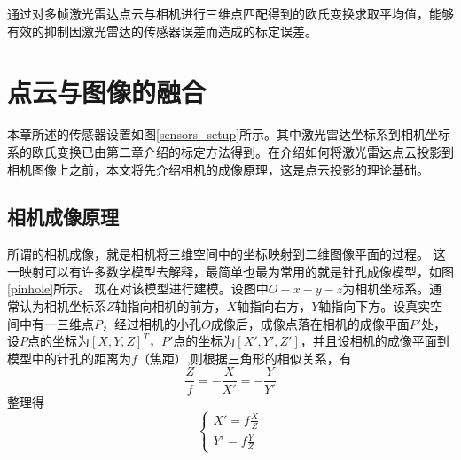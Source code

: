 通过对多帧激光雷达点云与相机进行三维点匹配得到的欧氏变换求取平均值，能够有效的抑制因激光雷达的传感器误差而造成的标定误差。

\section{点云与图像的融合}

本章所述的传感器设置如图\ref{sensors_setup}所示。其中激光雷达坐标系到相机坐标系的欧氏变换已由第二章介绍的标定方法得到。在介绍如何将激光雷达点云投影到相机图像上之前，本文将先介绍相机的成像原理，这是点云投影的理论基础。


\subsection{相机成像原理}

所谓的相机成像，就是相机将三维空间中的坐标映射到二维图像平面的过程。
这一映射可以有许多数学模型去解释，最简单也最为常用的就是针孔成像模型，如图\ref{pinhole}所示。
现在对该模型进行建模。设图中$O-x-y-z$为相机坐标系。通常认为相机坐标系$Z$轴指向相机的前方，$X$轴指向右方，$Y$轴指向下方。设真实空间中有一三维点$P$，经过相机的小孔$O$成像后，成像点落在相机的成像平面$P'$处，设$P$点的坐标为$[X, Y, Z]^T$，$P'$点的坐标为$[X', Y', Z']$，并且设相机的成像平面到模型中的针孔的距离为$f$（焦距）,则根据三角形的相似关系，有
\begin{equation}
    \frac{Z}{f}=-\frac{X}{X'}=-\frac{Y}{Y'}
\end{equation}
整理得
\begin{equation}
\left\{
    \begin{split}
        X'=f\frac{X}{Z} \\
        Y'=f\frac{Y}{Z}  
    \end{split}
\right.
\label{eq:pinhole}
\end{equation}

